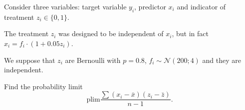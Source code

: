 
\begin{question}
Consider three variables: target variable \(y_i\), predictor \(x_i\) and indicator of treatment \(z_i \in \{0,1\}\).

The treatment \(z_i\) was designed to be independent of \(x_i\), but in fact \(x_i = f_i \cdot (1 + 0.05 z_i)\).

We suppose that \(z_i\) are Bernoulli with \(p=0.8\), \(f_i \sim \mathcal{N}(200;4)\) and they are independent.

Find the probability limit
\[
    \mathrm{plim} \frac{\sum (x_i - \bar x)(z_i - \bar z)}{n-1}.    
\]
\end{question}


